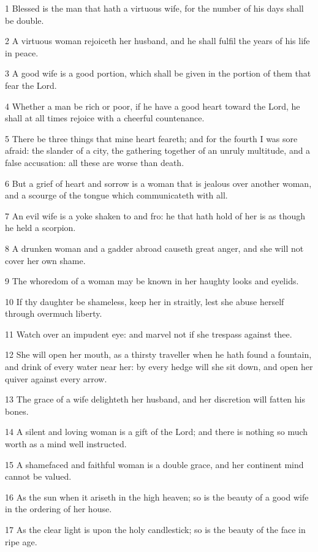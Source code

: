 \par 1 Blessed is the man that hath a virtuous wife, for the number of his days shall be double.
\par 2 A virtuous woman rejoiceth her husband, and he shall fulfil the years of his life in peace.
\par 3 A good wife is a good portion, which shall be given in the portion of them that fear the Lord.
\par 4 Whether a man be rich or poor, if he have a good heart toward the Lord, he shall at all times rejoice with a cheerful countenance.
\par 5 There be three things that mine heart feareth; and for the fourth I was sore afraid: the slander of a city, the gathering together of an unruly multitude, and a false accusation: all these are worse than death.
\par 6 But a grief of heart and sorrow is a woman that is jealous over another woman, and a scourge of the tongue which communicateth with all.
\par 7 An evil wife is a yoke shaken to and fro: he that hath hold of her is as though he held a scorpion.
\par 8 A drunken woman and a gadder abroad causeth great anger, and she will not cover her own shame.
\par 9 The whoredom of a woman may be known in her haughty looks and eyelids.
\par 10 If thy daughter be shameless, keep her in straitly, lest she abuse herself through overmuch liberty.
\par 11 Watch over an impudent eye: and marvel not if she trespass against thee.
\par 12 She will open her mouth, as a thirsty traveller when he hath found a fountain, and drink of every water near her: by every hedge will she sit down, and open her quiver against every arrow.
\par 13 The grace of a wife delighteth her husband, and her discretion will fatten his bones.
\par 14 A silent and loving woman is a gift of the Lord; and there is nothing so much worth as a mind well instructed.
\par 15 A shamefaced and faithful woman is a double grace, and her continent mind cannot be valued.
\par 16 As the sun when it ariseth in the high heaven; so is the beauty of a good wife in the ordering of her house.
\par 17 As the clear light is upon the holy candlestick; so is the beauty of the face in ripe age.
